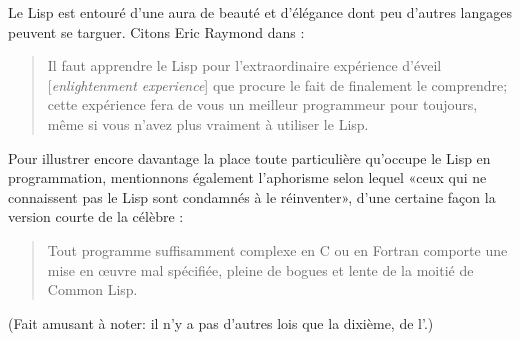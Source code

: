 Le Lisp est entouré d'une aura de beauté et d'élégance dont peu
d'autres langages peuvent se targuer. Citons Eric Raymond dans
:
\begin{quote}
  Il faut apprendre le Lisp pour l'extraordinaire expérience d'éveil
  [\emph{enlightenment experience}] que procure le fait de finalement
  le comprendre; cette expérience fera de vous un meilleur programmeur
  pour toujours, même si vous n'avez plus vraiment à utiliser le Lisp.
\end{quote}

Pour illustrer encore davantage la place toute particulière qu'occupe
le Lisp en programmation, mentionnons également l'aphorisme selon
lequel «ceux qui ne connaissent pas le Lisp sont condamnés à le
réinventer», d'une certaine façon la version courte de la célèbre
: %
\begin{quote}
  Tout programme suffisamment complexe en C ou en Fortran comporte une
  mise en œuvre mal spécifiée, pleine de bogues et lente de la moitié
  de Common Lisp.
\end{quote}
(Fait amusant à noter: il n'y a pas d'autres lois que la dixième, de
l'.)

